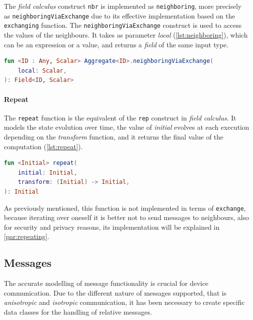 The \emph{field calculus} construct \texttt{nbr} is implemented as \texttt{neighboring}, more precisely as \texttt{neighboringViaExchange}
due to its effective implementation based on the \texttt{exchanging} function.
The \texttt{neighboringViaExchange} construct is used to access the values of the neighbours.
It takes as parameter \emph{local} (\ref{lst:neighboring}), which can be an expression or a value, and returns a \emph{field} of the same input type.

\begin{lstlisting}[language=kt,label={lst:neighboring}, caption={The signature of the \texttt{neighboringViaExchange} function.}]
fun <ID : Any, Scalar> Aggregate<ID>.neighboringViaExchange(
    local: Scalar,
): Field<ID, Scalar>
\end{lstlisting}


\paragraph{Repeat}
The \texttt{repeat} function is the equivalent of the \texttt{rep} construct in \emph{field calculus}.
It models the state evolution over time, the value of \emph{initial} evolves at each execution depending on the \emph{transform} function,
and it returns the final value of the computation (\ref{lst:repeat}).

\begin{lstlisting}[language=kt,label={lst:repeat}, caption={The signature of the \texttt{repeat} function.}]
fun <Initial> repeat(
    initial: Initial,
    transform: (Initial) -> Initial,
): Initial
\end{lstlisting}

As previously mentioned, this function is not implemented in terms of \texttt{exchange}, because iterating over oneself
it is better not to send messages to neighbours, also for security and privacy reasons, its implementation will be explained in \ref{par:repeating}.

\subsection{Messages}
\label{subsec:messages}

The accurate modelling of message functionality is crucial for device communication.
Due to the different nature of messages supported, that is \emph{anisotropic} and \emph{isotropic} communication,
it has been necessary to create specific data classes for the handling of relative messages.

